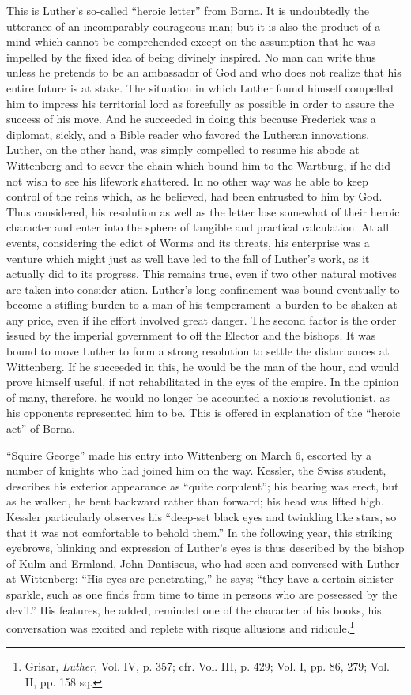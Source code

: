 This is Luther’s so-called “heroic letter” from Borna. It is undoubtedly
the utterance of an incomparably courageous man; but it
is also the product of a mind which cannot be comprehended except
on the assumption that he was impelled by the fixed idea of being
divinely inspired. No man can write thus unless he pretends to be an
ambassador of God and who does not realize that his entire future is
at stake. The situation in which Luther found himself compelled him
to impress his territorial lord as forcefully as possible in order to assure
the success of his move. And he succeeded in doing this because
Frederick was a diplomat, sickly, and a Bible reader who favored
the Lutheran innovations. Luther, on the other hand, was simply
compelled to resume his abode at Wittenberg and to sever the chain
which bound him to the Wartburg, if he did not wish to see his lifework
shattered. In no other way was he able to keep control of the
reins which, as he believed, had been entrusted to him by God.
Thus considered, his resolution as well as the letter lose somewhat
of their heroic character and enter into the sphere of tangible and practical
calculation. At all events, considering the edict of Worms and its
threats, his enterprise was a venture which might just as well
have led to the fall of Luther’s work, as it actually did to its progress.
This remains true, even if two other natural motives are taken into consider
ation. Luther’s long confinement was bound eventually to become
a stifling burden to a man of his temperament--a burden to be shaken
at any price, even if ihe effort involved great danger. The
second factor is the order issued by the imperial government to off
the Elector and the bishops. It was bound to move Luther to form a strong
resolution to settle the disturbances at Wittenberg. If he succeeded in
this, he would be the man of the hour, and would prove himself useful, if not
rehabilitated in the eyes of the empire. In the opinion of many,
therefore, he would no longer be accounted a noxious revolutionist,
as his opponents represented him to be. This is offered in explanation
of the “heroic act” of Borna.

“Squire George” made his entry into Wittenberg on March 6,
escorted by a number of knights who had joined him on the way.
Kessler, the Swiss student, describes his exterior appearance as “quite
corpulent”; his bearing was erect, but as he walked, he bent backward
rather than forward; his head was lifted high. Kessler particularly
observes his “deep-set black eyes and twinkling like stars, so that it was not
comfortable to behold them.”
In the following year, this striking eyebrows, blinking and
expression of Luther’s eyes is thus
described by the bishop of Kulm and Ermland, John Dantiscus, who
had seen and conversed with Luther at Wittenberg: “His eyes are
penetrating,” he says; “they have a certain sinister sparkle, such as
one finds from time to time in persons who are possessed by the
devil.” His features, he added, reminded one of the character of his
books, his conversation was excited and replete with risque allusions
and ridicule.\footnote
{Grisar, \textit{Luther}, Vol. IV, p. 357; cfr. Vol. III, p. 429; Vol. I, pp. 86, 279; Vol. II,
pp. 158 sq.}

